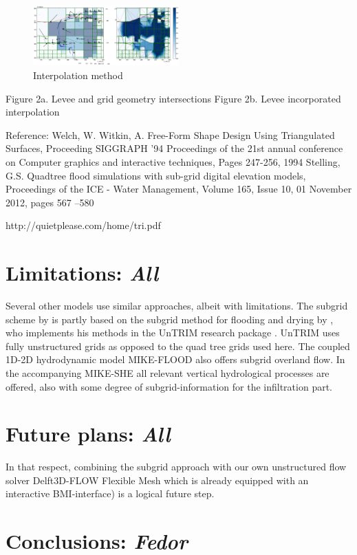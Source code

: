 \documentclass[a4paper]{article}
\begin{document}
\begin{figure}[h]
  \centering
  \includegraphics[width=0.5\textwidth]{interpolationlevees3}
  \caption{Interpolation method}
  \label{fig:interp_a}
\end{figure}

Figure 2a. Levee and grid geometry intersections        Figure 2b. Levee incorporated interpolation

Reference:
Welch, W. Witkin, A. Free-Form Shape Design Using Triangulated Surfaces, Proceeding SIGGRAPH '94 Proceedings of the 21st annual conference on Computer graphics and interactive techniques, Pages 247-256, 1994
Stelling, G.S. Quadtree flood simulations with sub-grid digital elevation models, Proceedings of the ICE - Water Management, Volume 165, Issue 10, 01 November 2012, pages 567 –580

http://quietplease.com/home/tri.pdf

\section{Limitations: \emph{All}}
Several other models use similar approaches, albeit with limitations. The subgrid scheme by \citet{Stelling2012} is partly based on the subgrid method for flooding and drying by \citet{Casulli2009}, who implements his methods in the UnTRIM research package \citet{Casulli2000}. UnTRIM uses fully unstructured grids as opposed to the quad tree grids used here. The coupled 1D-2D hydrodynamic model MIKE-FLOOD \citep{Dhi2014} also offers subgrid overland flow. In the accompanying MIKE-SHE all relevant vertical hydrological processes are offered, also with some degree of subgrid-information for the infiltration part.



\section{Future plans: \emph{All}}
In that respect, combining the subgrid approach with our own unstructured flow solver Delft3D-FLOW Flexible Mesh \citep{Kernkamp2011} which is already equipped with an interactive BMI-interface) is a logical future step.
\section{Conclusions: \emph{Fedor}}
\end{document}
